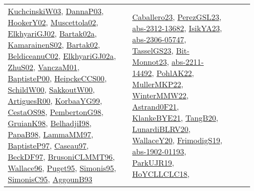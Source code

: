{\begin{longtable}{lp{3cm}>{\raggedright}p{6cm}>{\raggedright}p{6cm}p{8cm}}
\href{articles/KuchcinskiW03.pdf}{KuchcinskiW03}\cite{KuchcinskiW03}, \href{papers/DannaP03.pdf}{DannaP03}\cite{DannaP03}, \href{papers/HookerY02.pdf}{HookerY02}\cite{HookerY02}, \href{papers/Muscettola02.pdf}{Muscettola02}\cite{Muscettola02}, \href{papers/ElkhyariGJ02.pdf}{ElkhyariGJ02}\cite{ElkhyariGJ02}, \href{papers/Bartak02a.pdf}{Bartak02a}\cite{Bartak02a}, \href{papers/KamarainenS02.pdf}{KamarainenS02}\cite{KamarainenS02}, \href{papers/Bartak02.pdf}{Bartak02}\cite{Bartak02}, \href{papers/BeldiceanuC02.pdf}{BeldiceanuC02}\cite{BeldiceanuC02}, \href{papers/ElkhyariGJ02a.pdf}{ElkhyariGJ02a}\cite{ElkhyariGJ02a}, \href{papers/ZhuS02.pdf}{ZhuS02}\cite{ZhuS02}, \href{papers/VanczaM01.pdf}{VanczaM01}\cite{VanczaM01}, \href{articles/BaptisteP00.pdf}{BaptisteP00}\cite{BaptisteP00}, \href{articles/HeipckeCCS00.pdf}{HeipckeCCS00}\cite{HeipckeCCS00}, \href{articles/SchildW00.pdf}{SchildW00}\cite{SchildW00}, \href{articles/SakkoutW00.pdf}{SakkoutW00}\cite{SakkoutW00}, \href{articles/ArtiguesR00.pdf}{ArtiguesR00}\cite{ArtiguesR00}, \href{papers/KorbaaYG99.pdf}{KorbaaYG99}\cite{KorbaaYG99}, \href{papers/CestaOS98.pdf}{CestaOS98}\cite{CestaOS98}, \href{papers/PembertonG98.pdf}{PembertonG98}\cite{PembertonG98}, \href{papers/GruianK98.pdf}{GruianK98}\cite{GruianK98}, \href{articles/BelhadjiI98.pdf}{BelhadjiI98}\cite{BelhadjiI98}, \href{articles/PapaB98.pdf}{PapaB98}\cite{PapaB98}, \href{articles/LammaMM97.pdf}{LammaMM97}\cite{LammaMM97}, \href{papers/BaptisteP97.pdf}{BaptisteP97}\cite{BaptisteP97}, \href{papers/Caseau97.pdf}{Caseau97}\cite{Caseau97}, \href{papers/BeckDF97.pdf}{BeckDF97}\cite{BeckDF97}, \href{papers/BrusoniCLMMT96.pdf}{BrusoniCLMMT96}\cite{BrusoniCLMMT96}, \href{articles/Wallace96.pdf}{Wallace96}\cite{Wallace96}, \href{papers/Puget95.pdf}{Puget95}\cite{Puget95}, \href{papers/Simonis95.pdf}{Simonis95}\cite{Simonis95}, \href{papers/SimonisC95.pdf}{SimonisC95}\cite{SimonisC95}, \href{articles/AggounB93.pdf}{AggounB93}\cite{AggounB93} & \href{articles/Caballero23.pdf}{Caballero23}\cite{Caballero23}, \href{papers/PerezGSL23.pdf}{PerezGSL23}\cite{PerezGSL23}, \href{articles/abs-2312-13682.pdf}{abs-2312-13682}\cite{abs-2312-13682}, \href{articles/IsikYA23.pdf}{IsikYA23}\cite{IsikYA23}, \href{articles/abs-2306-05747.pdf}{abs-2306-05747}\cite{abs-2306-05747}, \href{papers/TasselGS23.pdf}{TasselGS23}\cite{TasselGS23}, \href{papers/Bit-Monnot23.pdf}{Bit-Monnot23}\cite{Bit-Monnot23}, \href{articles/abs-2211-14492.pdf}{abs-2211-14492}\cite{abs-2211-14492}, \href{articles/PohlAK22.pdf}{PohlAK22}\cite{PohlAK22}, \href{articles/MullerMKP22.pdf}{MullerMKP22}\cite{MullerMKP22}, \href{papers/WinterMMW22.pdf}{WinterMMW22}\cite{WinterMMW22}, \href{papers/Astrand0F21.pdf}{Astrand0F21}\cite{Astrand0F21}, \href{papers/KlankeBYE21.pdf}{KlankeBYE21}\cite{KlankeBYE21}, \href{papers/TangB20.pdf}{TangB20}\cite{TangB20}, \href{articles/LunardiBLRV20.pdf}{LunardiBLRV20}\cite{LunardiBLRV20}, \href{articles/WallaceY20.pdf}{WallaceY20}\cite{WallaceY20}, \href{papers/FrimodigS19.pdf}{FrimodigS19}\cite{FrimodigS19}, \href{articles/abs-1902-01193.pdf}{abs-1902-01193}\cite{abs-1902-01193}, \href{papers/ParkUJR19.pdf}{ParkUJR19}\cite{ParkUJR19}, \href{papers/HoYCLLCLC18.pdf}{HoYCLLCLC18}\cite{HoYCLLCLC18}, 
\end{longtable}}
